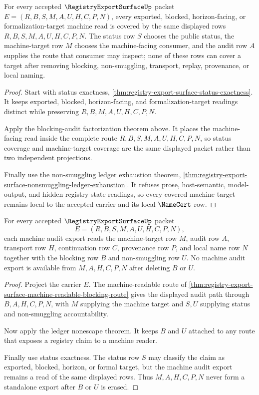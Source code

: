 \begin{theorem}
\label{thm:registry-export-surface-status-machine-target-coverage}
For every accepted $\RegistryExportSurfaceUp$ packet $E=(R,B,S,M,A,U,H,C,P,N)$, every exported, blocked, horizon-facing, or formalization-target machine read is covered by the same displayed rows $R,B,S,M,A,U,H,C,P,N$. The status row $S$ chooses the public status, the machine-target row $M$ chooses the machine-facing consumer, and the audit row $A$ supplies the route that consumer may inspect; none of these rows can cover a target after removing blocking, non-smuggling, transport, replay, provenance, or local naming.
\end{theorem}
\begin{proof}
Start with status exactness, \autoref{thm:registry-export-surface-status-exactness}. It keeps exported, blocked, horizon-facing, and formalization-target readings distinct while preserving $R,B,M,A,U,H,C,P,N$.

Apply the blocking-audit factorization theorem above. It places the machine-facing read inside the complete route $R,B,S,M,A,U,H,C,P,N$, so status coverage and machine-target coverage are the same displayed packet rather than two independent projections.

Finally use the non-smuggling ledger exhaustion theorem, \autoref{thm:registry-export-surface-nonsmuggling-ledger-exhaustion}. It refuses prose, host-semantic, model-output, and hidden-registry-state readings, so every covered machine target remains local to the accepted carrier and its local $\NameCert$ row.
\end{proof}

\begin{theorem}
\label{thm:registry-export-surface-machine-audit-totality}
For every accepted $\RegistryExportSurfaceUp$ packet
$$
E=(R,B,S,M,A,U,H,C,P,N),
$$
each machine audit export reads the machine-target row $M$, audit row $A$, transport row $H$, continuation row $C$, provenance row $P$, and local name row $N$ together with the blocking row $B$ and non-smuggling row $U$. No machine audit export is available from $M,A,H,C,P,N$ after deleting $B$ or $U$.
\end{theorem}
\begin{proof}
Project the carrier $E$. The machine-readable route of \autoref{thm:registry-export-surface-machine-readable-blocking-route} gives the displayed audit path through $B,A,H,C,P,N$, with $M$ supplying the machine target and $S,U$ supplying status and non-smuggling accountability.

Now apply the ledger nonescape theorem. It keeps $B$ and $U$ attached to any route that exposes a registry claim to a machine reader.

Finally use status exactness. The status row $S$ may classify the claim as exported, blocked, horizon, or formal target, but the machine audit export remains a read of the same displayed rows. Thus $M,A,H,C,P,N$ never form a standalone export after $B$ or $U$ is erased.
\end{proof}

